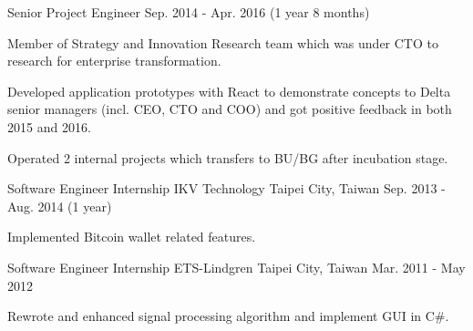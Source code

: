 \begin{cventries}
  \cventry
    {Senior Project Engineer} %
    {} %
    {} %
    {Sep. 2014 - Apr. 2016 (1 year 8 months)} %
    {
      \begin{cvitems} %
        \item {Member of Strategy and Innovation Research team which was under CTO to research for enterprise transformation.}
        \item {Developed application prototypes with React to demonstrate concepts to Delta senior managers (incl. CEO, CTO and COO) and got positive feedback in both 2015 and 2016.}
        \item {Operated 2 internal projects which transfers to BU/BG after incubation stage. }
      \end{cvitems}
    }

  \cventry
    {Software Engineer Internship} %
    {IKV Technology} %
    {Taipei City, Taiwan} %
    {Sep. 2013 - Aug. 2014 (1 year)} %
    {
      \begin{cvitems} %
        \item {Implemented Bitcoin wallet related features.}
      \end{cvitems}
    }

  \cventry
    {Software Engineer Internship} %
    {ETS-Lindgren} %
    {Taipei City, Taiwan} %
    {Mar. 2011 - May 2012} %
    {
      \begin{cvitems} %
        \item {Rewrote and enhanced signal processing algorithm and implement GUI in C\#.}
      \end{cvitems}
    }
\end{cventries}
